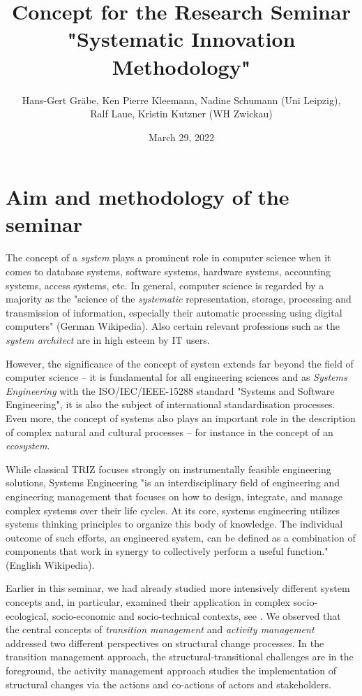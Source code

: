 \documentclass[11pt,a4paper]{article}
\title{Concept for the Research Seminar\\ "Systematic Innovation Methodology"}
\author{Hans-Gert Gr\"abe, Ken Pierre Kleemann, Nadine Schumann (Uni
  Leipzig),\\ Ralf Laue, Kristin Kutzner (WH Zwickau) }
\date{March 29, 2022}
\begin{document}
\maketitle

\section{Aim and methodology of the seminar}

The concept of a \emph{system} plays a prominent role in computer science when
it comes to database systems, software systems, hardware systems, accounting
systems, access systems, etc.  In general, computer science is regarded by a
majority as the "science of the \emph{systematic} representation, storage,
processing and transmission of information, especially their automatic
processing using digital computers" (German Wikipedia).  Also certain relevant
professions such as the \emph{system architect} are in high esteem by IT
users.

However, the significance of the concept of system extends far beyond the
field of computer science -- it is fundamental for all engineering sciences
and as \emph{Systems Engineering} with the ISO/IEC/IEEE-15288 standard
"Systems and Software Engineering", it is also the subject of international
standardisation processes.  Even more, the concept of systems also plays an
important role in the description of complex natural and cultural processes --
for instance in the concept of an \emph{ecosystem}.

While classical TRIZ focuses strongly on instrumentally feasible engineering
solutions, Systems Engineering "is an interdisciplinary field of engineering
and engineering management that focuses on how to design, integrate, and
manage complex systems over their life cycles. At its core, systems
engineering utilizes systems thinking principles to organize this body of
knowledge. The individual outcome of such efforts, an engineered system, can
be defined as a combination of components that work in synergy to collectively
perform a useful function." (English Wikipedia). 

Earlier in this seminar, we had already studied more intensively different
system concepts and, in particular, examined their application in complex
socio-ecological, socio-economic and socio-technical contexts, see
\cite{Graebe2020}. We observed that the central concepts of \emph{transition
  management} and \emph{activity management} addressed two different
perspectives on structural change processes. In the transition management
approach, the structural-transitional challenges are in the foreground, the
activity management approach studies the implementation of structural changes
via the actions and co-actions of actors and stakeholders.
\end{document}
